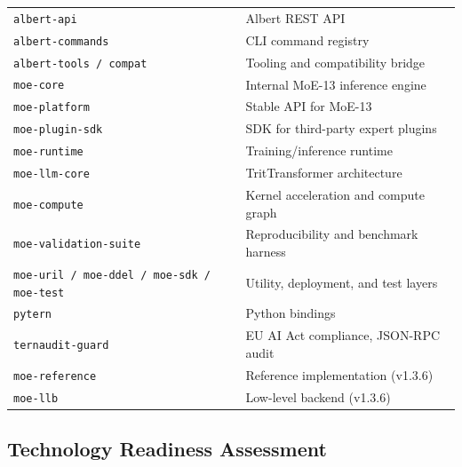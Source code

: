 \documentclass[journal,10pt,twocolumn]{IEEEtran}
\begin{document}
\begin{table}[h]
\begin{tabular}{p{2.6cm}p{5.0cm}}
\texttt{albert-api}         & Albert REST API \\
\texttt{albert-commands}    & CLI command registry \\
\texttt{albert-tools / compat} & Tooling and compatibility bridge \\
\midrule
\texttt{moe-core}           & Internal MoE-13 inference engine \\
\texttt{moe-platform}       & Stable API for MoE-13 \\
\texttt{moe-plugin-sdk}     & SDK for third-party expert plugins \\
\texttt{moe-runtime}        & Training/inference runtime \\
\texttt{moe-llm-core}       & TritTransformer architecture \\
\texttt{moe-compute}        & Kernel acceleration and compute graph \\
\texttt{moe-validation-suite} & Reproducibility and benchmark harness \\
\texttt{moe-uril / moe-ddel / moe-sdk / moe-test} & Utility, deployment, and test layers \\
\midrule
\texttt{pytern}             & Python bindings \\
\texttt{ternaudit-guard}    & EU AI Act compliance, JSON-RPC audit \\
\midrule
\texttt{moe-reference}      & Reference implementation (v1.3.6) \\
\texttt{moe-llb}            & Low-level backend (v1.3.6) \\
\bottomrule
\end{tabular}
\end{table}

\subsection*{Technology Readiness Assessment}
\end{document}
